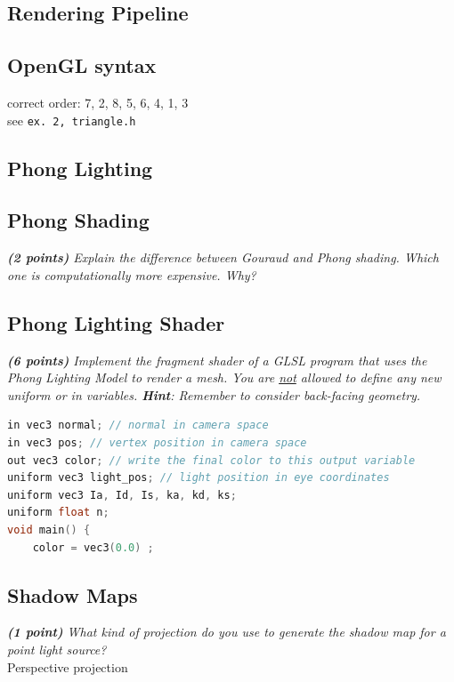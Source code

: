 \documentclass[a4paper,10pt]{article}
\begin{document}
\subsection{Rendering Pipeline}

\subsection{OpenGL syntax}
correct order: 
7, 2, 8, 5, 6, 4, 1, 3\\
see \texttt{ex. 2, triangle.h}
\subsection{Phong Lighting}
 
\subsection{Phong Shading}
\textit{\textbf{(2 points)} Explain the difference between Gouraud and Phong shading. Which one is computationally more expensive. Why?}\\

\subsection{Phong Lighting Shader}
\textit{\textbf{(6 points)} Implement the fragment shader of a GLSL program that uses the Phong Lighting Model to render a mesh. You are \underline{not} allowed to define any new uniform or in variables. \textbf{Hint}: Remember to consider back-facing geometry.}\\

\begin{lstlisting}[language=C]
in vec3 normal; // normal in camera space
in vec3 pos; // vertex position in camera space
out vec3 color; // write the final color to this output variable
uniform vec3 light_pos; // light position in eye coordinates
uniform vec3 Ia, Id, Is, ka, kd, ks; 
uniform float n;
void main() {
	color = vec3(0.0) ;
\end{lstlisting}
\subsection{Shadow Maps}
\textit{\textbf{(1 point)} What kind of projection do you use to generate the shadow map for a point light source? }\\

Perspective projection\\
\end{document}
